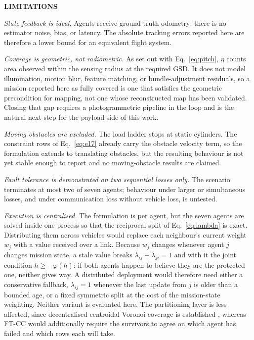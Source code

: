 \documentclass[10pt,letterpaper]{article}
\newcommand{\headingone}[1]{%
    \par\vspace{9pt}%
    {\centering\fontsize{12}{14}\selectfont\bfseries\MakeUppercase{#1}\par}%
    \vspace{4pt}\noindent\ignorespaces}
\newcommand{\cit}[1]{\cite{#1}}
\begin{document}
\headingone{Limitations}

\emph{State feedback is ideal.} Agents receive ground-truth odometry; there is no estimator
noise, bias, or latency. The absolute tracking errors reported here are therefore a lower
bound for an equivalent flight system.

\emph{Coverage is geometric, not radiometric.} As set out with Eq.~\eqref{eq:pitch},
$\eta$ counts area observed within the sensing radius at the required GSD. It does not
model illumination, motion blur, feature matching, or bundle-adjustment residuals, so a
mission reported here as fully covered is one that satisfies the geometric precondition
for mapping, not one whose reconstructed map has been validated. Closing that gap requires
a photogrammetric pipeline in the loop and is the natural next step for the payload side of
this work.

\emph{Moving obstacles are excluded.} The load ladder stops at static cylinders. The
constraint rows of Eq.~\eqref{eq:e17} already carry the obstacle velocity term, so the
formulation extends to translating obstacles, but the resulting behaviour is not yet stable
enough to report and no moving-obstacle results are claimed.

\emph{Fault tolerance is demonstrated on two sequential losses only.} The scenario
terminates at most two of seven agents; behaviour under larger or simultaneous losses, and
under communication loss without vehicle loss, is untested.

\emph{Execution is centralised.} The formulation is per agent, but the seven agents are
solved inside one process so that the reciprocal split of Eq.~\eqref{eq:lambda} is exact.
Distributing them across vehicles would replace each neighbour's current weight $w_j$ with
a value received over a link. Because $w_j$ changes whenever agent $j$ changes mission
state, a stale value breaks $\lambda_{ij}+\lambda_{ji}=1$ and with it the joint condition
$\dot h\ge-\varphi(h)$: if both agents happen to believe they are the protected one, neither
gives way. A distributed deployment would therefore need either a conservative fallback,
$\lambda_{ij}=1$ whenever the last update from $j$ is older than a bounded age, or a fixed
symmetric split at the cost of the mission-state weighting. Neither variant is evaluated
here. The partitioning layer is less affected, since decentralised centroidal Voronoi
coverage is established \cit{cortesCoverageControl2004}, whereas FT-CC would additionally
require the survivors to agree on which agent has failed and which rows each will take.
\end{document}
